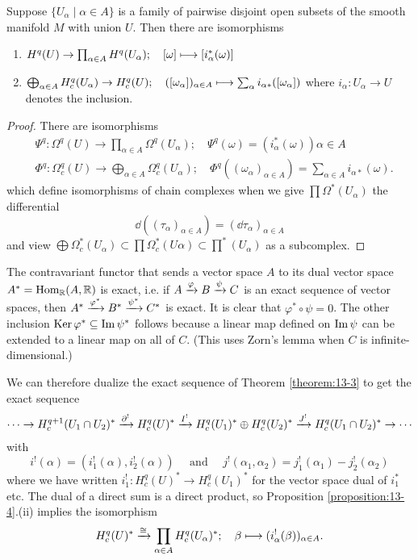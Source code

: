 \begin{proposition}\label{proposition:13-4}
  Suppose $\{U_\alpha \mid \alpha\in A\}$ is a family of pairwise disjoint open subsets of the smooth 
  manifold $M$ with union $U$. Then there are isomorphisms
  \begin{enumerate}
    \item $H^q(U)\to\prod_{\alpha\in A}H^q(U_\alpha);\quad [\omega]\longmapsto[i^*_\alpha(\omega)]$
    \item $\bigoplus_{\alpha\in A}H_c^q(U_\alpha)\to H_c^q(U);\quad ([\omega_\alpha])_{\alpha\in A}\longmapsto \sum_\alpha i_{\alpha*}([\omega_\alpha])$ 
      where $i_\alpha:U_\alpha\to U$ denotes the inclusion.
  \end{enumerate}
\end{proposition}

\begin{proof}
  There are isomorphisms 
  \begin{align*}
    & \Psi^q:\Omega^q(U)\to\prod_{\alpha\in A}\Omega^q(U_\alpha);
      \quad \Psi^q(\omega) = (i_\alpha^*(\omega)){\alpha\in A}\\
    & \Phi^q:\Omega_c^q(U)\to\bigoplus_{\alpha\in A}\Omega_c^q(U_\alpha);
      \quad \Phi^q((\omega_\alpha)_{\alpha\in A}) = \sum_{\alpha\in A}i_{\alpha*}(\omega).
  \end{align*}
  which define isomorphisms of chain complexes when we give $\prod\Omega^*(U_\alpha)$ the differential
  \[
    \dd((\tau_\alpha)_{\alpha\in A}) = (\!\dd\tau_\alpha)_{\alpha\in A}
  \]
  and view $\bigoplus\Omega_c^*(U_\alpha)\subset\prod\Omega_c^*(U\alpha)\subset\prod^*(U_\alpha)$ as a subcomplex.
\end{proof}

The contravariant functor that sends a vector space $A$ to its dual vector space
$A^* = \operatorname{Hom}_{{\mathbb{R}}}(A, {\mathbb{R}})$ is exact, i.e. if $A\xra[\varphi]B\xra[\psi]C$ is an exact sequence of vector
spaces, then $A^*\xra[\varphi^*]B^*\xra[\psi^*]C^*$ is exact. It is clear that $\varphi^*\circ\psi=0$. 
The other inclusion $\operatorname{Ker}\varphi^*\subseteq\operatorname{Im}\psi^*$ follows because a linear map defined on $\operatorname{Im}\psi$ 
can be extended to a linear map on all of $C$. (This uses Zorn's lemma when $C$ is infinite-dimensional.)

We can therefore dualize the exact sequence of Theorem \ref{theorem:13-3} to get the exact sequence
\begin{align}\label{eq:13-5}
  \cdots\ra H_c^{q+1}(U_1\cap U_2)^*
  \xra[\partial^!] H_c^q(U)^*
  \xra[I^!] H_c^q(U_1)^*\oplus H_c^q(U_2)^*
  \xra[J^!] H_c^q(U_1\cap U_2)^*
  \ra\cdots
\end{align}
with 
\[
  i^!(\alpha) = \left(i_1^!(\alpha), i_2^!(\alpha)\right) \quad\text{ and }\quad
  j^!(\alpha_1, \alpha_2) = j_1^!(\alpha_1) - j_2^!(\alpha_2)
\]
where we have written $i_1^!:H_c^q(U)^*\to H_c^q(U_1)^*$ for the vector space dual of $i_1^*$ etc.
The dual of a direct sum is a direct product, so Proposition \ref{proposition:13-4}.(ii) implies the
isomorphism
\begin{align}\label{eq:13-6}
  H_c^q(U)^*\xra[\simee]\prod_{\alpha\in A}H_c^q(U_\alpha)^*;\quad \beta\ma (i_\alpha^!(\beta))_{\alpha\in A}.
\end{align}

